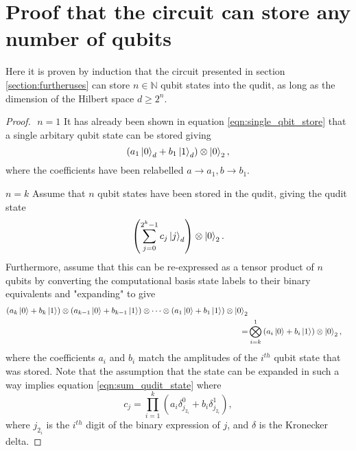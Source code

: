 \appendix
\appendixpage
\addappheadtotoc
\setcounter{equation}{0}
\renewcommand{\theequation}{A.\arabic{equation}}
\section{Proof that the circuit can store any number of qubits}
\label{appendix:any_num_qubits}
Here it is proven by induction that the circuit presented in section \ref{section:furtheruses} can store $n\in\mathbb{N}$ qubit states into the qudit, as long as the dimension of the Hilbert space $d\geq 2^n$.
\begin{proof}$ $\newline
    $n=1$\newline
    It has already been shown in equation \ref{eqn:single_qbit_store} that a single arbitary qubit state can be stored giving
    \begin{equation}
        (a_1\ket{0}_d + b_1\ket{1}_d)\otimes\ket{0}_2,
    \end{equation}
    where the coefficients have been relabelled $a \rightarrow a_1, b\rightarrow b_1$.
    \newline

    $n = k$\newline
    Assume that $n$ qubit states have been stored in the qudit, giving the qudit state
    \begin{equation}
        \left(\sum_{j=0}^{2^k - 1}c_j\ket{j}_d\right)\otimes\ket{0}_2.
        \label{eqn:sum_qudit_state}
    \end{equation}
    Furthermore, assume that this can be re-expressed as a tensor product of $n$ qubits by converting the computational basis state labels to their binary equivalents and "expanding" to give
    \begin{align}
        (a_k\ket{0} + b_k\ket{1})\otimes(a_{k-1}\ket{0} + b_{k-1}\ket{1})\otimes\cdots\otimes(a_1\ket{0} + b_1\ket{1})\otimes\ket{0}_2\\
        =&\bigotimes_{i = k}^{1}\left(a_i\ket{0} + b_i\ket{1}\right)\otimes\ket{0}_2,
    \end{align}
    where the coefficients $a_{i}$ and $b_{i}$ match the amplitudes of the $i^{th}$ qubit state that was stored.
    Note that the assumption that the state can be expanded in such a way implies equation \ref{eqn:sum_qudit_state} where
    \begin{equation}
        c_j = \prod_{i=1}^{k}(a_i \delta^{0}_{j_{2_i}} + b_i\delta^{1}_{j_{2_i}}),
    \end{equation}
    where $j_{2_i}$ is the $i^{th}$ digit of the binary expression of $j$, and $\delta$ is the Kronecker delta.\newline


\end{proof}
